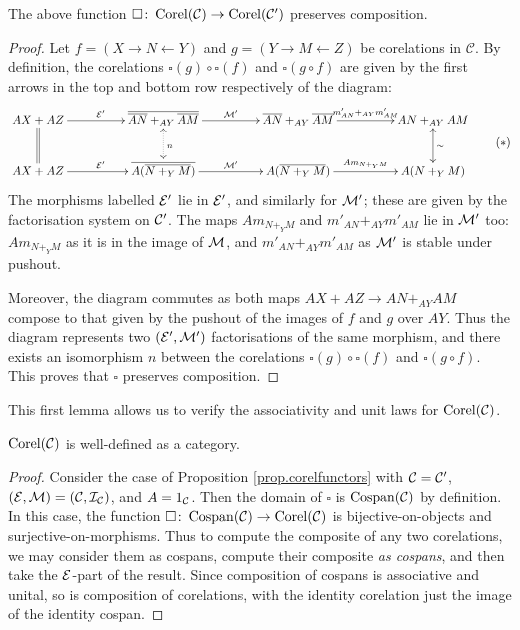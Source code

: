 \begin{lemma} \label{lem.corelfuncomposition}
  The above function $\square{\colon} \operatorname{{Corel}}(\mathcal C) \to \operatorname{{Corel}}(\mathcal C')$ preserves
  composition.
\end{lemma}
\begin{proof}
  Let $f = (X \longrightarrow N \longleftarrow Y)$ and $g= (Y \longrightarrow M
  \longleftarrow Z)$ be corelations in $\mathcal C$. By definition, the
  corelations $\square(g) \circ \square(f)$ and $\square(g \circ f)$ are given
  by the first arrows in the top and bottom row respectively of the diagram:
  \[ \label{diag.eparts}
    \begin{aligned}
      \xymatrixcolsep{4pc}
      \xymatrixrowsep{2pc}
      \xymatrix{
	AX+AZ \ar[r]^{\mc E'} \ar@{=}[d] & \overline{\overline{AN}+_{AY}\overline{AM}}
	\ar[r]^{\mc M'} \ar@{<.>}[d]^{n} & \overline{AN}+_{AY}\overline{AM}
	\ar[r]^{m'_{AN}+_{AY}m'_{AM}} &
	AN+_{AY}AM \\
	AX+AZ \ar[r]^{\mc E'} & \overline{A(\overline{N+_YM})} \ar[r]^{\mc M'} &
	A(\overline{N+_YM}) \ar[r]^{Am_{N+_YM}} & A(N+_YM) \ar@{<->}[u]_{\sim}
      }
    \end{aligned}
    \tag{$\ast$}
  \]
  The morphisms labelled $\mathcal E'$ lie in $\mathcal E'$, and similarly for $\mathcal M'$;
  these are given by the factorisation system on $\mathcal C'$.  The maps
  $Am_{N+_YM}$ and $m'_{AN}+_{AY}m'_{AM}$ lie in $\mathcal M'$ too: $Am_{N+_YM}$ as
  it is in the image of $\mathcal M$, and $m'_{AN}+_{AY}m'_{AM}$ as $\mathcal M'$ is
  stable under pushout. 

  Moreover, the diagram commutes as both maps $AX+AZ \to AN+_{AY}AM$ compose to
  that given by the pushout of the images of $f$ and $g$ over $AY$.  Thus the
  diagram represents two $(\mathcal E', \mathcal M')$ factorisations of the same morphism,
  and there exists an isomorphism $n$ between the corelations $\square(g) \circ
  \square(f)$ and $\square(g\circ f)$. This proves that $\square$ preserves
  composition.
\end{proof}
This first lemma allows us to verify the associativity and unit laws for
$\operatorname{{Corel}}(\mathcal C)$.
\begin{corollary}
  $\operatorname{{Corel}}(\mathcal C)$ is well-defined as a category.
\end{corollary}
\begin{proof}
  Consider the case of Proposition \ref{prop.corelfunctors} with $\mathcal C = \mathcal
  C'$, $(\mathcal E,\mathcal M) = (\mathcal C, \mathcal I_{\mathcal C})$, and $A = 1_{\mathcal C}$. Then the
  domain of $\square$ is $\operatorname{{Cospan}}(\mathcal C)$ by definition. In this case, the
  function $\square{\colon} \operatorname{{Cospan}}(\mathcal C) \to \operatorname{{Corel}}(\mathcal C)$ is
  bijective-on-objects and surjective-on-morphisms. Thus to compute the
  composite of any two corelations, we may consider them as cospans, compute
  their composite \emph{as cospans}, and then take the $\mathcal E$-part of the
  result. Since composition of cospans is associative and unital, so is
  composition of corelations, with the identity corelation just the image of the
  identity cospan.
\end{proof}

